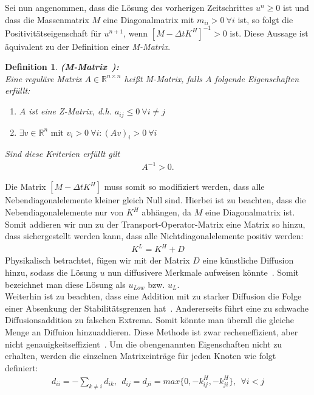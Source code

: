 \documentclass[12pt,titlepage]{article}
\newtheorem{defi}{Definition}[section]
\begin{document}
Sei nun angenommen, dass die Lösung des vorherigen Zeitschrittes $u^n\ge0$ ist und dass die Massenmatrix $M$ eine Diagonalmatrix mit $m_{ii}>0~\forall i$ ist, so folgt die Positivitätseigenschaft für $u^{n+1}$, wenn $[M-\Delta tK^H]^{-1}>0$ ist. Diese Aussage ist äquivalent zu der Definition einer \textit{M-Matrix}.
\begin{defi}\label{def:MMatrix}
 \textbf{(M-Matrix~\cite{fiedler2008special}):}\\
Eine reguläre Matrix $A\in \mathbb{R}^{n\times n}$ heißt M-Matrix, falls $A$ folgende Eigenschaften erfüllt:
\begin{enumerate}
 \item $A$ ist eine Z-Matrix, d.h. $a_{ij}\le0~\forall i\neq j$
 \item $\exists v\in\mathbb{R}^n\text{ mit }v_i>0~\forall i:(Av)_i>0~\forall i$
\end{enumerate}
Sind diese Kriterien erfüllt gilt
\begin{align*}
 A^{-1}>0.
\end{align*}
\end{defi}
 Die Matrix $[M-\Delta tK^H]$ muss somit so modifiziert werden, dass alle Nebendiagonalelemente kleiner gleich Null sind. Hierbei ist zu beachten, dass die Nebendiagonalelemente nur von $K^H$ abhängen, da $M$ eine Diagonalmatrix ist. Somit addieren wir nun zu der Transport-Operator-Matrix eine Matrix so hinzu, dass sichergestellt werden kann, dass alle Nichtdiagonalelemente positiv werden:
\begin{align}
 K^L=K^H+D\nonumber
\end{align}
Physikalisch betrachtet, fügen wir mit der Matrix $D$ eine künstliche Diffusion hinzu, sodass die Lösung $u$ nun diffusivere Merkmale aufweisen könnte~\cite{kuzmin2002flux}. Somit bezeichnet man diese Lösung als $u_{Low}$ bzw. $u_L$.\\
Weiterhin ist zu beachten, dass eine Addition mit zu starker Diffusion die Folge einer Absenkung der Stabilitätsgrenzen hat~\cite{kuzmin2002flux}. Andererseits führt eine zu schwache Diffusionsaddition zu falschen Extrema. Somit könnte man überall die gleiche Menge an Diffuion hinzuaddieren. Diese Methode ist zwar recheneffizient, aber nicht genauigkeitseffizient~\cite{kuzmin2002flux}. Um die obengenannten Eigenschaften nicht zu erhalten, werden die einzelnen Matrixeinträge für jeden Knoten wie folgt definiert:
\begin{align}
 d_{ii}=-\sum_{k\neq i}d_{ik},~~d_{ij}=d_{ji}=max\{0,-k_{ij}^H,-k_{ji}^H\},~~\forall i<j\label{eq:D}
\end{align}
\end{document}
